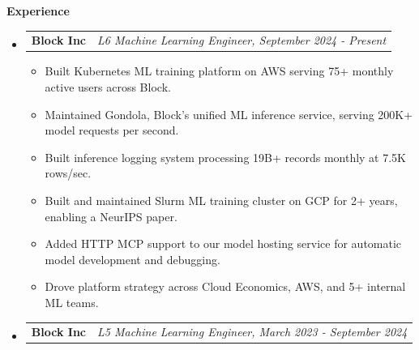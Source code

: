 \documentclass[letterpaper,10pt]{article}
\makeatletter
\newcommand{\resitem}[1]{\item #1 \vspace{-2pt}}
\newcommand{\resheading}[1]{{\large \colorbox{mygrey}{\begin{minipage}{\textwidth}{\textbf{#1 \vphantom{p\^{E}}}}\end{minipage}}}}
\newcommand{\ressubheading}[4]{
\begin{tabular*}{7.0in}{l@{\extracolsep{\fill}}r}
		\textbf{#1} & \textit{#4} \\
\end{tabular*}\vspace{-6pt}}
\makeatother
\begin{document}
\resheading{Experience}
	\begin{itemize}
		\item
		\ressubheading{Block Inc}{Houston, TX}{L6 Machine Learning Engineer}{L6 Machine Learning Engineer, September 2024 - Present}
		\begin{itemize}
			\resitem{Built Kubernetes ML training platform on AWS serving 75+ monthly active users across Block.}
			\resitem{Maintained Gondola, Block's unified ML inference service, serving 200K+ model requests per second.}
			\resitem{Built inference logging system processing 19B+ records monthly at 7.5K rows/sec.}
			\resitem{Built and maintained Slurm ML training cluster on GCP for 2+ years, enabling a NeurIPS paper.}
			\resitem{Added HTTP MCP support to our model hosting service for automatic model development and debugging.}
			\resitem{Drove platform strategy across Cloud Economics, AWS, and 5+ internal ML teams.}
		\end{itemize}
		\item
			\ressubheading{Block Inc}{Boulder, CO}{L5 Machine Learning Engineer}{L5 Machine Learning Engineer, March 2023 - September 2024}
			\begin{itemize}

\end{itemize}
\end{itemize}
\end{document}
